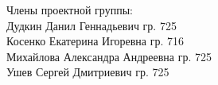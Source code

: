 \begin{flushright}
\begin{minipage}{0.45\textwidth}
\begin{flushright}
Члены проектной группы:\\
\underline{\hspace{1.5cm}} Дудкин Данил Геннадьевич гр. 725\\
\underline{\hspace{1.5cm}} Косенко Екатерина Игоревна гр. 716\\
\underline{\hspace{1.2cm}} Михайлова Александра Андреевна гр. 725\\
\underline{\hspace{1.5cm}} Ушев Сергей Дмитриевич гр. 725\\
 \end{flushright}
\end{minipage}
\end{flushright}
\clearpage
